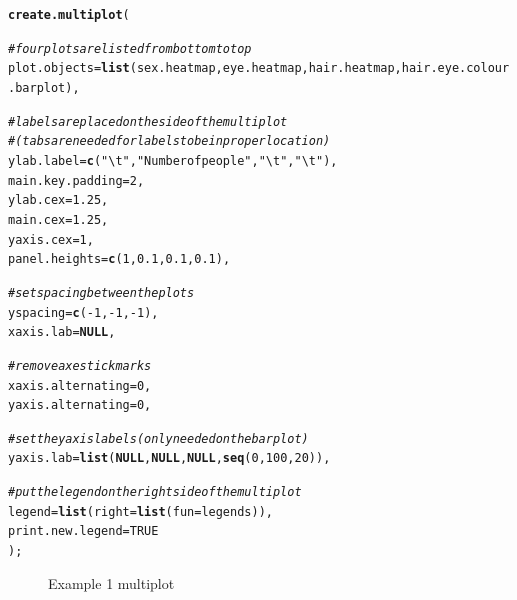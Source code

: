 \documentclass[letterpaper]{article}\usepackage[]{graphicx}\usepackage[]{color}
\makeatletter
\newcommand{\hlnum}[1]{\textcolor[rgb]{0.686,0.059,0.569}{#1}}%
\newcommand{\hlstr}[1]{\textcolor[rgb]{0.192,0.494,0.8}{#1}}%
\newcommand{\hlcom}[1]{\textcolor[rgb]{0.678,0.584,0.686}{\textit{#1}}}%
\newcommand{\hlopt}[1]{\textcolor[rgb]{0,0,0}{#1}}%
\newcommand{\hlstd}[1]{\textcolor[rgb]{0.345,0.345,0.345}{#1}}%
\newcommand{\hlkwa}[1]{\textcolor[rgb]{0.161,0.373,0.58}{\textbf{#1}}}%
\newcommand{\hlkwc}[1]{\textcolor[rgb]{0.333,0.667,0.333}{#1}}%
\newcommand{\hlkwd}[1]{\textcolor[rgb]{0.737,0.353,0.396}{\textbf{#1}}}%
\newenvironment{kframe}{%
 \def\at@end@of@kframe{}%
 \ifinner\ifhmode%
  \def\at@end@of@kframe{\end{minipage}}%
  \begin{minipage}{\columnwidth}%
 \fi\fi%
 \def\FrameCommand##1{\hskip\@totalleftmargin \hskip-\fboxsep
 \colorbox{shadecolor}{##1}\hskip-\fboxsep
     \hskip-\linewidth \hskip-\@totalleftmargin \hskip\columnwidth}%
 \MakeFramed {\advance\hsize-\width
   \@totalleftmargin\z@ \linewidth\hsize
   \@setminipage}}%
 {\par\unskip\endMakeFramed%
 \at@end@of@kframe}
\newenvironment{knitrout}{}{} %
\makeatother
\begin{document}
\begin{knitrout}
\color{fgcolor}\begin{kframe}
\begin{alltt}
 \hlkwd{create.multiplot}\hlstd{(}

         \hlcom{# four plots are listed from bottom to top }
         \hlkwc{plot.objects} \hlstd{=} \hlkwd{list}\hlstd{(sex.heatmap, eye.heatmap, hair.heatmap, hair.eye.colour.barplot),}

         \hlcom{# labels are placed on the side of the multiplot }
         \hlcom{# (tabs are needed for labels to be in proper location)}
         \hlkwc{ylab.label} \hlstd{=} \hlkwd{c}\hlstd{(}\hlstr{"\textbackslash{}t"}\hlstd{,} \hlstr{"Number of people"}\hlstd{,} \hlstr{"\textbackslash{}t"}\hlstd{,} \hlstr{"\textbackslash{}t"}\hlstd{),}
         \hlkwc{main.key.padding} \hlstd{=} \hlnum{2}\hlstd{,}
         \hlkwc{ylab.cex} \hlstd{=} \hlnum{1.25}\hlstd{,}
         \hlkwc{main.cex} \hlstd{=} \hlnum{1.25}\hlstd{,}
         \hlkwc{yaxis.cex} \hlstd{=} \hlnum{1}\hlstd{,}
         \hlkwc{panel.heights} \hlstd{=} \hlkwd{c}\hlstd{(}\hlnum{1}\hlstd{,} \hlnum{0.1}\hlstd{,} \hlnum{0.1}\hlstd{,} \hlnum{0.1}\hlstd{),}

         \hlcom{# set spacing between the plots}
         \hlkwc{yspacing} \hlstd{=} \hlkwd{c}\hlstd{(}\hlopt{-}\hlnum{1}\hlstd{,} \hlopt{-}\hlnum{1}\hlstd{,} \hlopt{-}\hlnum{1}\hlstd{),}
         \hlkwc{xaxis.lab} \hlstd{=} \hlkwa{NULL}\hlstd{,}

         \hlcom{# remove axes tick marks}
         \hlkwc{xaxis.alternating} \hlstd{=} \hlnum{0}\hlstd{,}
         \hlkwc{yaxis.alternating} \hlstd{=} \hlnum{0}\hlstd{,}

         \hlcom{# set the yaxis labels (only needed on the bar plot)}
         \hlkwc{yaxis.lab} \hlstd{=} \hlkwd{list}\hlstd{(}\hlkwa{NULL}\hlstd{,} \hlkwa{NULL}\hlstd{,} \hlkwa{NULL}\hlstd{,} \hlkwd{seq}\hlstd{(}\hlnum{0}\hlstd{,} \hlnum{100}\hlstd{,} \hlnum{20}\hlstd{)),}

         \hlcom{# put the legend on the right side of the multiplot}
         \hlkwc{legend} \hlstd{=} \hlkwd{list}\hlstd{(}\hlkwc{right} \hlstd{=} \hlkwd{list}\hlstd{(}\hlkwc{fun} \hlstd{= legends)),}
         \hlkwc{print.new.legend} \hlstd{=} \hlnum{TRUE}
         \hlstd{);}
\end{alltt}
\end{kframe}\begin{figure}

{\centering {} 

}

\caption[Example 1 multiplot]{Example 1 multiplot\label{fig:multiplotex1_final}}
\end{figure}


\end{knitrout}
\end{document}
